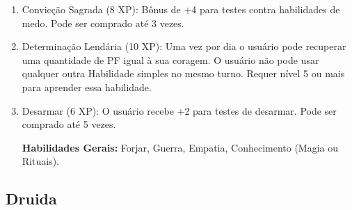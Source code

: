 \begin{enumerate}
 	\item Convicção Sagrada (8 XP): Bônus de +4 para testes contra habilidades de medo. Pode ser comprado até 3 vezes.

\item Determinação Lendária (10 XP): Uma vez por dia o usuário pode recuperar uma quantidade de PF igual à sua coragem. O usuário não pode usar qualquer outra Habilidade simples no mesmo turno. Requer nível 5 ou mais para aprender essa habilidade. 

 	\item Desarmar (6 XP): O usuário recebe +2 para testes de desarmar. Pode ser comprado até 5 vezes.
  
\textbf{Habilidades Gerais:} Forjar, Guerra, Empatia, Conhecimento (Magia ou Rituais).
 

\end{enumerate}
 
 
  \subsection{Druida}  
  
